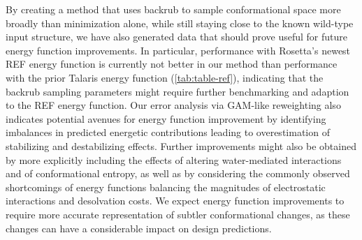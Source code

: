 By creating a method that uses backrub to sample conformational space more broadly than minimization alone, while still staying close to the known wild-type input structure, we have also generated data that should prove useful for future energy function improvements.
In particular, performance with Rosetta's newest REF energy function\cite{alford_rosetta_2017} is currently not better in our method than performance with the prior Talaris\cite{leaver-fay_chapter_2013,song_structure-guided_2011,shapovalov_smoothed_2011} energy function (\cref{tab:table-ref}), indicating that the backrub sampling parameters might require further benchmarking and adaption to the REF energy function.
Our error analysis via GAM-like reweighting also indicates potential avenues for energy function improvement by identifying imbalances in predicted energetic contributions leading to overestimation of stabilizing and destabilizing effects.
Further improvements might also be obtained by more explicitly including the effects of altering water-mediated interactions\cite{lai_enhancing_2017} and of conformational entropy\cite{hu_protein_2006,guerois_predicting_2002}, as well as by considering the commonly observed shortcomings of energy functions balancing the magnitudes of electrostatic interactions and desolvation costs.
We expect energy function improvements to require more accurate representation of subtler conformational changes, as these changes can have a considerable impact on design predictions\cite{dou_sampling_2017}.